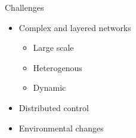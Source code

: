 \begin{frame}{Challenges}
  \begin{card}
    \begin{itemize}
      \item<1-| alert@1> Complex and layered networks
      \begin{itemize}
        \item <2-| alert@2>Large scale
        \item <3-| alert@3>Heterogenous
        \item <4-| alert@4>Dynamic
      \end{itemize}
      \item<5-| alert@5> Distributed control
      \item<6-| alert@6> Environmental changes
    \end{itemize}
  \end{card}
\end{frame}